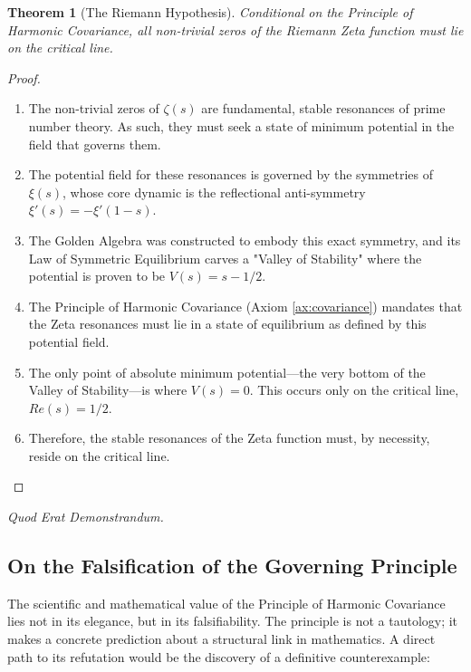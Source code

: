 \documentclass{article}
\theoremstyle{plain}
\newtheorem{theorem}{Theorem}[section]
\theoremstyle{definition}
\theoremstyle{remark}
\begin{document}
\begin{theorem}[The Riemann Hypothesis]
Conditional on the Principle of Harmonic Covariance, all non-trivial zeros of the Riemann Zeta function must lie on the critical line.
\end{theorem}
\begin{proof}
\begin{enumerate}
    \item The non-trivial zeros of $\zeta(s)$ are fundamental, stable resonances of prime number theory. As such, they must seek a state of minimum potential in the field that governs them.
    \item The potential field for these resonances is governed by the symmetries of $\xi(s)$, whose core dynamic is the reflectional anti-symmetry $\xi'(s) = -\xi'(1-s)$.
    \item The Golden Algebra was constructed to embody this exact symmetry, and its Law of Symmetric Equilibrium carves a "Valley of Stability" where the potential is proven to be $V(s) = s - 1/2$.
    \item The Principle of Harmonic Covariance (Axiom \ref{ax:covariance}) mandates that the Zeta resonances must lie in a state of equilibrium as defined by this potential field.
    \item The only point of absolute minimum potential—the very bottom of the Valley of Stability—is where $V(s) = 0$. This occurs only on the critical line, $Re(s)=1/2$.
    \item Therefore, the stable resonances of the Zeta function must, by necessity, reside on the critical line.
\end{enumerate}
\end{proof}

\begin{center}
\textit{Quod Erat Demonstrandum.}
\end{center}

\subsection*{On the Falsification of the Governing Principle}

The scientific and mathematical value of the Principle of Harmonic Covariance lies not in its elegance, but in its falsifiability. The principle is not a tautology; it makes a concrete prediction about a structural link in mathematics. A direct path to its refutation would be the discovery of a definitive counterexample:
\end{document}
